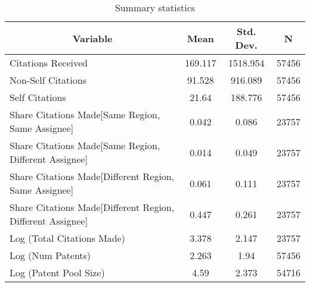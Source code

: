 
\begin{table}[htbp]\centering \caption{Summary statistics \label{sumstat}}
\begin{tabular}{l c c  c}\hline\hline
\multicolumn{1}{c}{\textbf{Variable}} & \textbf{Mean}
 & \textbf{Std. Dev.} & \textbf{N}\\ \hline
Citations Received & 169.117 & 1518.954  & 57456\\
Non-Self Citations & 91.528 & 916.089  & 57456\\
Self Citations & 21.64 & 188.776  & 57456\\
Share Citations Made[Same Region, Same Assignee] & 0.042 & 0.086  & 23757\\
Share Citations Made[Same Region, Different Assignee] & 0.014 & 0.049  & 23757\\
Share Citations Made[Different Region, Same Assignee] & 0.061 & 0.111  & 23757\\
Share Citations Made[Different Region, Different Assignee] & 0.447 & 0.261  & 23757\\
Log (Total Citations Made) & 3.378 & 2.147  & 23757\\
Log (Num Patents) & 2.263 & 1.94  & 57456\\
Log (Patent Pool Size) & 4.59 & 2.373  & 54716\\
\hline\end{tabular}
\end{table}
